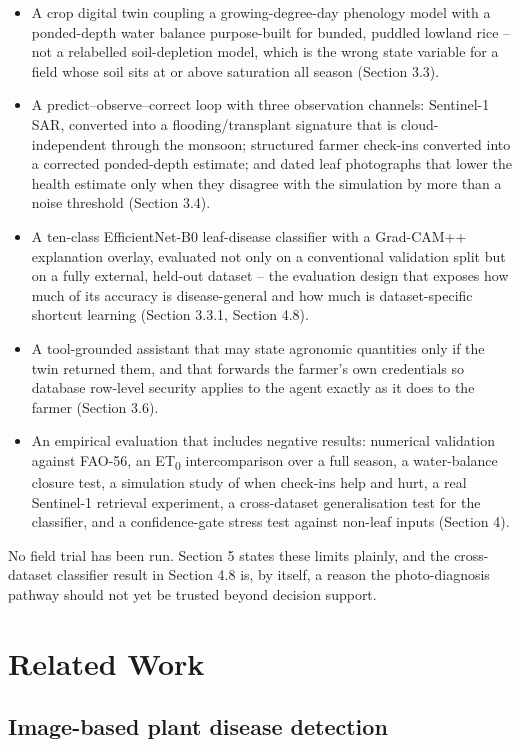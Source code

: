 \documentclass[11pt,a4paper]{article}
\begin{document}
\begin{itemize}[leftmargin=1.4em]
\item A crop digital twin coupling a growing-degree-day phenology model with a ponded-depth water balance purpose-built for bunded, puddled lowland rice -- not a relabelled soil-depletion model, which is the wrong state variable for a field whose soil sits at or above saturation all season (Section 3.3).
\item A predict--observe--correct loop with three observation channels: Sentinel-1 SAR, converted into a flooding/transplant signature that is cloud-independent through the monsoon; structured farmer check-ins converted into a corrected ponded-depth estimate; and dated leaf photographs that lower the health estimate only when they disagree with the simulation by more than a noise threshold (Section 3.4).
\item A ten-class EfficientNet-B0 leaf-disease classifier with a Grad-CAM++ explanation overlay, evaluated not only on a conventional validation split but on a fully external, held-out dataset -- the evaluation design that exposes how much of its accuracy is disease-general and how much is dataset-specific shortcut learning (Section 3.3.1, Section 4.8).
\item A tool-grounded assistant that may state agronomic quantities only if the twin returned them, and that forwards the farmer's own credentials so database row-level security applies to the agent exactly as it does to the farmer (Section 3.6).
\item An empirical evaluation that includes negative results: numerical validation against FAO-56, an ET\textsubscript{0} intercomparison over a full season, a water-balance closure test, a simulation study of when check-ins help and hurt, a real Sentinel-1 retrieval experiment, a cross-dataset generalisation test for the classifier, and a confidence-gate stress test against non-leaf inputs (Section 4).
\end{itemize}

No field trial has been run. Section 5 states these limits plainly, and the cross-dataset classifier result in Section 4.8 is, by itself, a reason the photo-diagnosis pathway should not yet be trusted beyond decision support.

\section{Related Work}

\subsection{Image-based plant disease detection}
\end{document}
